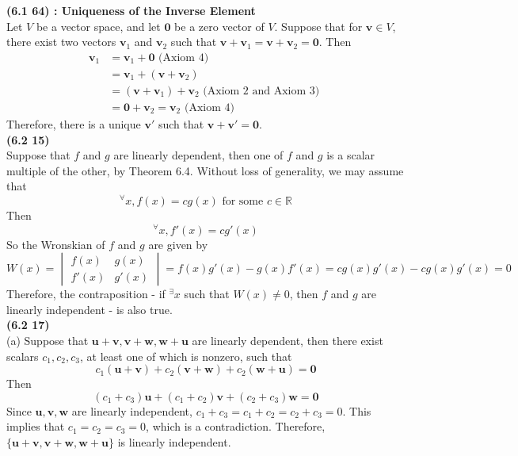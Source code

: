 \textbf{(6.1 64) : Uniqueness of the Inverse Element} \\
Let $V$ be a vector space, and let $\textbf{0}$ be a zero vector of $V$. Suppose that for $\textbf{v} \in V$, there exist two vectors $\textbf{v}_1$ and $\textbf{v}_2$ such that $\textbf{v} + \textbf{v}_1 = \textbf{v} + \textbf{v}_2 = \textbf{0}$. Then \begin{align*}
	\textbf{v}_1 &= \textbf{v}_1 + \textbf{0} \mbox{ (Axiom 4) } \\
	&= \textbf{v}_1 + (\textbf{v} + \textbf{v}_2) \\
	&= (\textbf{v} + \textbf{v}_1) + \textbf{v}_2 \mbox{ (Axiom 2 and Axiom 3) } \\
	&= \textbf{0} + \textbf{v}_2 = \textbf{v}_2 \mbox{ (Axiom 4) }
\end{align*}
Therefore, there is a unique $\textbf{v}'$ such that $\textbf{v} + \textbf{v}' = \textbf{0}$. \\

\textbf{(6.2 15)} \\
Suppose that $f$ and $g$ are linearly dependent, then one of $f$ and $g$ is a scalar multiple of the other, by Theorem 6.4. Without loss of generality, we may assume that \begin{equation*}
	^\forall x, f(x) = cg(x) \mbox{ for some } c \in \mathbb{R}
\end{equation*} Then \begin{equation*}
	^\forall x, f'(x) = cg'(x)
\end{equation*} So the Wronskian of $f$ and $g$ are given by \begin{equation*}
	W(x) = \begin{vmatrix}
		f(x) & g(x) \\ f'(x) & g'(x)
	\end{vmatrix} = f(x)g'(x) - g(x)f'(x) = cg(x)g'(x) - cg(x)g'(x) = 0
\end{equation*} Therefore, the contraposition - if $^\exists x$ such that $W(x) \neq 0$, then $f$ and $g$ are linearly independent - is also true. \\

\textbf{(6.2 17)} \\
(a) Suppose that $\textbf{u} + \textbf{v}, \textbf{v} + \textbf{w}, \textbf{w} + \textbf{u}$ are linearly dependent, then there exist scalars $c_1, c_2, c_3$, at least one of which is nonzero, such that \begin{equation*}
	c_1(\textbf{u} + \textbf{v}) + c_2(\textbf{v} + \textbf{w}) + c_2(\textbf{w} + \textbf{u}) = \textbf{0}
\end{equation*} Then \begin{equation*}
	(c_1 + c_3)\textbf{u} + (c_1 + c_2)\textbf{v} + (c_2 + c_3)\textbf{w} = \textbf{0}
\end{equation*} Since $\textbf{u}, \textbf{v}, \textbf{w}$ are linearly independent, $c_1 + c_3 = c_1 + c_2 = c_2 + c_3 = 0$. This implies that $c_1 = c_2 = c_3 = 0$, which is a contradiction. Therefore, $\{\textbf{u} + \textbf{v}, \textbf{v} + \textbf{w}, \textbf{w} + \textbf{u}\}$ is linearly independent. \\

